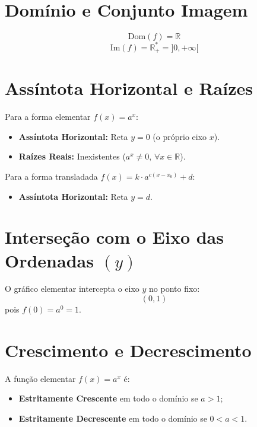 \documentclass[12pt,a4paper]{report}
\begin{document}
	\section{Domínio e Conjunto Imagem}
	\begin{destaque}
		$$\text{Dom}(f) = \mathbb{R}$$
		$$\text{Im}(f) = \mathbb{R}^*_+ = {]0, +\infty[}$$
	\end{destaque}
	
	\section{Assíntota Horizontal e Raízes}
	\begin{destaque}
		Para a forma elementar $f(x) = a^x$:
		\begin{itemize}
			\item \textbf{Assíntota Horizontal:} Reta $y = 0$ (o próprio eixo $x$).
			\item \textbf{Raízes Reais:} Inexistentes ($a^x \neq 0, \, \forall x \in \mathbb{R}$).
		\end{itemize}
		Para a forma transladada $f(x) = k \cdot a^{c(x-x_0)} + d$:
		\begin{itemize}
			\item \textbf{Assíntota Horizontal:} Reta $y = d$.
		\end{itemize}
	\end{destaque}
	
	\section{Interseção com o Eixo das Ordenadas $(y)$}
	\begin{destaque}
		O gráfico elementar intercepta o eixo $y$ no ponto fixo:
		$$(0, 1)$$
		pois $f(0) = a^0 = 1$.
	\end{destaque}
	
	\section{Crescimento e Decrescimento}
	\begin{destaque}
		A função elementar $f(x) = a^x$ é:
		\begin{itemize}
			\item \textbf{Estritamente Crescente} em todo o domínio se $a > 1$;
			\item \textbf{Estritamente Decrescente} em todo o domínio se $0 < a < 1$.
		\end{itemize}
	\end{destaque}
	
\end{document}
